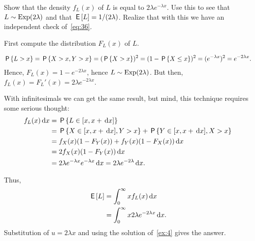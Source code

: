 \documentclass[a4paper,12pt]{article}
\begin{document}
\begin{exercise}
  Show that the density $f_{L}(x)$ of $L$ is equal to $2\lambda e^{-\lambda x}$.
  Use this to see that $L\sim \mathrm{Exp}(2\lambda)$ and that $\,\mathsf{E}\left[L\right] = 1/(2\lambda)$.
  Realize that with this we have an independent check of~\cref{eq:36}.
\begin{hint}
  First compute the distribution $F_L(x)$ of $L$.
\end{hint}
\begin{solution}
  \begin{align}
    \label{eq:22}
\P{L>x}  = \P{X>x, Y> x} = (\P{X>x})^2 = (1-\P{X\leq x})^2= (e^{-\lambda x})^2 = e^{-2\lambda x}.
  \end{align}
Hence, $F_{L}(x) = 1-e^{-2 \lambda x}$, hence $L\sim \mathrm{Exp}(2\lambda)$. But then, $f_L(x) = F_L'(x) = 2 \lambda e^{-2\lambda x}$. 

With infinitesimals we can get the same result, but mind, this technique requires some serious thought: 
\begin{align}
  \label{eq:24}
f_L(x) \d x 
&= \P{L \in [x, x+\d x]} \\
&= \P{X \in [x, x+\d x], Y > x}  + \P{Y \in [x, x+\d x], X > x} \\
&= f_X(x)(1-F_Y(x)) + f_Y(x) (1-F_X(x) )\d x \\
&= 2f_X(x)(1-F_Y(x)) \d x \\
&= 2 \lambda e^{-\lambda x} e^{-\lambda x} \d x  = 2 \lambda e^{-2 \lambda}\d x.
\end{align}


Thus, 
  \begin{align}
\,\mathsf{E}\left[L\right]
&= \int_{0}^{\infty}  x f_{L}(x) \,\textrm{d}x  \\
&= \int_{0}^{\infty}  x 2 \lambda e^{-2\lambda x} \,\textrm{d}x.
  \end{align}
Substitution of $u=2\lambda x$ and using the solution of~\cref{ex:4} gives the answer.

\end{solution}
\end{exercise}
\end{document}
